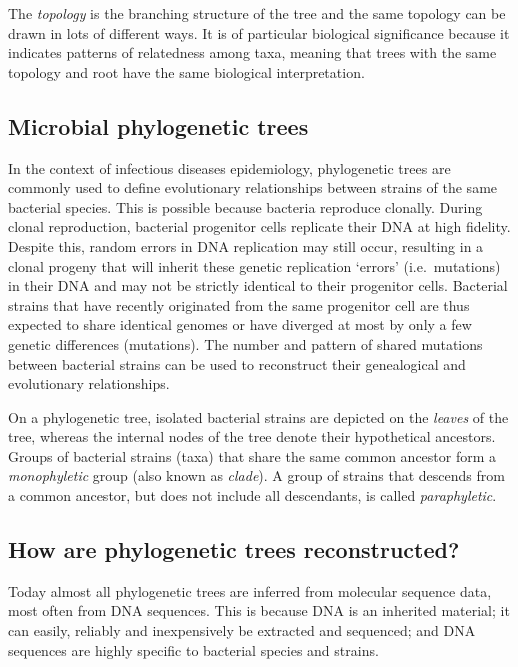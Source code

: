 \documentclass[11pt]{article}
\begin{document}
The \textit{topology} is the branching structure of the tree and the same
topology can be drawn in lots of different ways. It is of particular
biological significance because it indicates patterns of relatedness
among taxa, meaning that trees with the same topology and root have the
same biological interpretation.

    \hypertarget{microbial-phylogenetic-trees}{%
\subsection{Microbial phylogenetic
trees}\label{microbial-phylogenetic-trees}}

In the context of infectious diseases epidemiology, phylogenetic trees
are commonly used to define evolutionary relationships between strains
of the same bacterial species. This is possible because bacteria
reproduce clonally. During clonal reproduction, bacterial progenitor
cells replicate their DNA at high fidelity. Despite this, random errors
in DNA replication may still occur, resulting in a clonal progeny that
will inherit these genetic replication `errors' (i.e.~mutations) in
their DNA and may not be strictly identical to their progenitor cells.
Bacterial strains that have recently originated from the same progenitor
cell are thus expected to share identical genomes or have diverged at
most by only a few genetic differences (mutations). The number and
pattern of shared mutations between bacterial strains can be used to
reconstruct their genealogical and evolutionary relationships.

On a phylogenetic tree, isolated bacterial strains are depicted on the
\textit{leaves} of the tree, whereas the internal nodes of the tree denote
their hypothetical ancestors. Groups of bacterial strains (taxa) that
share the same common ancestor form a \textit{monophyletic} group (also
known as \textit{clade}). A group of strains that descends from a common
ancestor, but does not include all descendants, is called
\textit{paraphyletic}.

    \hypertarget{how-are-phylogenetic-trees-reconstructed}{%
\subsection{How are phylogenetic trees
reconstructed?}\label{how-are-phylogenetic-trees-reconstructed}}

Today almost all phylogenetic trees are inferred from molecular sequence
data, most often from DNA sequences. This is because DNA is an inherited
material; it can easily, reliably and inexpensively be extracted and
sequenced; and DNA sequences are highly specific to bacterial species
and strains.
\end{document}
